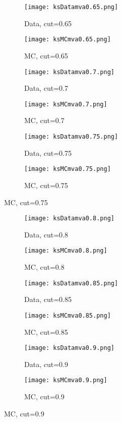 \begin{figure}[H]
	\ContinuedFloat
	\begin{subfigure}{0.5\linewidth}
		\caption{Data, cut=0.65}
		\texttt{[image: ksDatamva0.65.png]}
	\end{subfigure}
	\begin{subfigure}{0.5\linewidth}
		\caption{MC, cut=0.65}
		\texttt{[image: ksMCmva0.65.png]}
	\end{subfigure}
	\begin{subfigure}{0.5\linewidth}
		\caption{Data, cut=0.7}
		\texttt{[image: ksDatamva0.7.png]}
	\end{subfigure}
	\begin{subfigure}{0.5\linewidth}
		\caption{MC, cut=0.7}
		\texttt{[image: ksMCmva0.7.png]}
	\end{subfigure}
	\begin{subfigure}{0.5\linewidth}
		\caption{Data, cut=0.75}
		\texttt{[image: ksDatamva0.75.png]}
	\end{subfigure}
	\begin{subfigure}{0.5\linewidth}
		\caption{MC, cut=0.75}
		\texttt{[image: ksMCmva0.75.png]}
	\end{subfigure}
\end{figure}


\begin{figure}[H]
	\ContinuedFloat
	\begin{subfigure}{0.5\linewidth}
		\caption{Data, cut=0.8}
		\texttt{[image: ksDatamva0.8.png]}
	\end{subfigure}
	\begin{subfigure}{0.5\linewidth}
		\caption{MC, cut=0.8}
		\texttt{[image: ksMCmva0.8.png]}
	\end{subfigure}
	\begin{subfigure}{0.5\linewidth}
		\caption{Data, cut=0.85}
		\texttt{[image: ksDatamva0.85.png]}
	\end{subfigure}
	\begin{subfigure}{0.5\linewidth}
		\caption{MC, cut=0.85}
		\texttt{[image: ksMCmva0.85.png]}
	\end{subfigure}
	\begin{subfigure}{0.5\linewidth}
		\caption{Data, cut=0.9}
		\texttt{[image: ksDatamva0.9.png]}
	\end{subfigure}
	\begin{subfigure}{0.5\linewidth}
		\caption{MC, cut=0.9}
		\texttt{[image: ksMCmva0.9.png]}
	\end{subfigure}
\end{figure}

